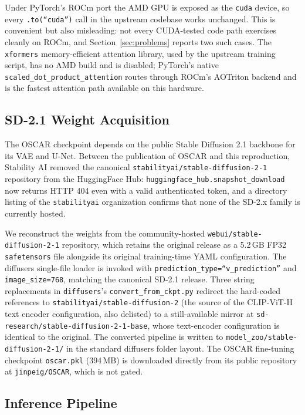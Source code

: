 \documentclass[conference]{IEEEtran}
\begin{document}
Under PyTorch's ROCm port the AMD GPU is exposed as the \texttt{cuda} device,
so every \texttt{.to(``cuda'')} call in the upstream codebase works unchanged.
This is convenient but also misleading: not every CUDA-tested code path
exercises cleanly on ROCm, and Section~\ref{sec:problems} reports two such
cases. The \texttt{xformers} memory-efficient attention library, used by the
upstream training script, has no AMD build and is disabled; PyTorch's native
\texttt{scaled\_dot\_product\_attention} routes through ROCm's AOTriton backend
and is the fastest attention path available on this hardware.

\subsection{SD-2.1 Weight Acquisition}

The OSCAR checkpoint depends on the public Stable Diffusion 2.1 backbone for
its VAE and U-Net. Between the publication of OSCAR and this reproduction,
Stability AI removed the canonical \texttt{stabilityai/stable-diffusion-2-1}
repository from the HuggingFace Hub: \texttt{huggingface\_hub.snapshot\_download}
now returns HTTP 404 even with a valid authenticated token, and a directory
listing of the \texttt{stabilityai} organization confirms that none of the
SD-2.x family is currently hosted.

We reconstruct the weights from the community-hosted
\texttt{webui/stable-diffusion-2-1} repository, which retains the original
release as a 5.2\,GB FP32 \texttt{safetensors} file alongside its original
training-time YAML configuration. The diffusers single-file loader is
invoked with \texttt{prediction\_type=``v\_prediction''} and
\texttt{image\_size=768}, matching the canonical SD-2.1 release. Three string
replacements in \texttt{diffusers}'s \texttt{convert\_from\_ckpt.py}
redirect the hard-coded references to \texttt{stabilityai/stable-diffusion-2}
(the source of the CLIP-ViT-H text encoder configuration, also delisted) to a
still-available mirror at \texttt{sd-research/stable-diffusion-2-1-base}, whose
text-encoder configuration is identical to the original. The converted pipeline
is written to \texttt{model\_zoo/stable-diffusion-2-1/} in the standard
diffusers folder layout. The OSCAR fine-tuning checkpoint \texttt{oscar.pkl}
(394\,MB) is downloaded directly from its public repository at
\texttt{jinpeig/OSCAR}, which is not gated.

\subsection{Inference Pipeline}
\end{document}
